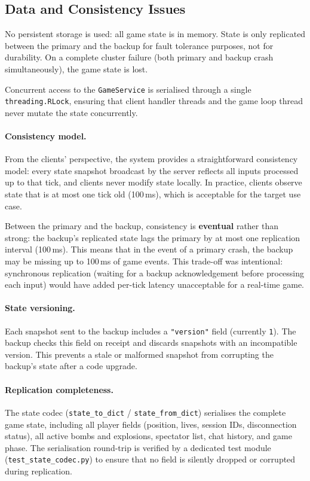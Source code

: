 \documentclass{scrartcl}
\begin{document}
\subsection{Data and Consistency Issues}\label{data-and-consistency-issues}

No persistent storage is used: all game state is in memory.
State is only replicated between the primary and the backup for fault tolerance purposes, not for durability.
On a complete cluster failure (both primary and backup crash simultaneously), the game state is lost.

Concurrent access to the \texttt{GameService} is serialised through a single \texttt{threading.RLock}, ensuring that client handler threads and the game loop thread never mutate the state concurrently.

\paragraph{Consistency model.}
From the clients' perspective, the system provides a straightforward consistency model: every state snapshot broadcast by the server reflects all inputs processed up to that tick, and clients never modify state locally.
In practice, clients observe state that is at most one tick old (100\,ms), which is acceptable for the target use case.

Between the primary and the backup, consistency is \textbf{eventual} rather than strong: the backup's replicated state lags the primary by at most one replication interval (100\,ms).
This means that in the event of a primary crash, the backup may be missing up to 100\,ms of game events.
This trade-off was intentional: synchronous replication (waiting for a backup acknowledgement before processing each input) would have added per-tick latency unacceptable for a real-time game.

\paragraph{State versioning.}
Each snapshot sent to the backup includes a \texttt{"version"} field (currently \texttt{1}).
The backup checks this field on receipt and discards snapshots with an incompatible version.
This prevents a stale or malformed snapshot from corrupting the backup's state after a code upgrade.

\paragraph{Replication completeness.}
The state codec (\texttt{state\_to\_dict} / \texttt{state\_from\_dict}) serialises the complete game state, including all player fields (position, lives, session IDs, disconnection status), all active bombs and explosions, spectator list, chat history, and game phase.
The serialisation round-trip is verified by a dedicated test module (\texttt{test\_state\_codec.py}) to ensure that no field is silently dropped or corrupted during replication.
\end{document}
